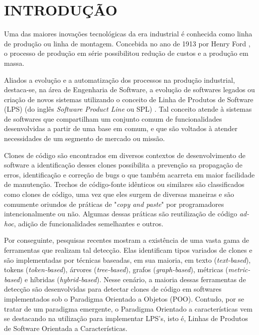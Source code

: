 \chapter{INTRODUÇÃO}
\label{cap:introducao}

Uma das maiores inovações tecnológicas da era industrial é conhecida como linha de produção ou linha de montagem. Concebida no ano de 1913 por Henry Ford \cite{correa2000administraccao}, o processo de produção em série possibilitou redução de custos e a produção em massa.

 Aliados a evolução e a automatização dos processos na produção industrial, destaca-se, na área de Engenharia de Software, a evolução de softwares legados ou criação de novos sistemas utilizando o conceito de Linha de Produtos de Software (LPS) (do inglês \textit{Software Product Line} ou SPL) \cite{laguna2013systematic}. Tal conceito atende à sistemas de softwares que compartilham um conjunto comum de funcionalidades desenvolvidas a partir de uma base em comum, e que são voltados à atender necessidades de um segmento de mercado ou missão. 

Clones de código são encontrados em diversos contextos de desenvolvimento de software a identificação desses clones possibilita a prevenção sa propagação de erros, identificação e correção de bugs o que também acarreta em maior facilidade de manutenção. Trechos de código-fonte idênticos ou similares são classificados como clones de código, uma vez que eles surgem de diversas maneiras e são comumente oriundos de práticas de "\textit{copy and paste}" por programadores intencionalmente ou não. Algumas dessas práticas são reutilização de código \textit{ad-hoc}, adição de funcionalidades semelhantes e outros.

Por conseguinte, pesquisas recentes mostram a existência de uma vasta gama de ferramentas que realizam tal detecção. Elas identificam tipos variados de clones e são implementadas por técnicas baseadas, em sua maioria, em texto (\textit{text-based}), tokens (\textit{token-based}), árvores (\textit{tree-based}), grafos (\textit{graph-based}), métricas (\textit{metric-based}) e híbridas (\textit{hybrid-based}). Nesse cenário, a maioria dessas ferramentas de detecção são desenvolvidas para detectar clones de código em softwares implementados sob o Paradigma Orientado a Objetos (POO). Contudo, por se tratar de um paradigma emergente, o Paradigma Orientado a características vem se destacando na utilização para implementar LPS's, isto é, Linhas de Produtos de Software Orientada a Características. 


